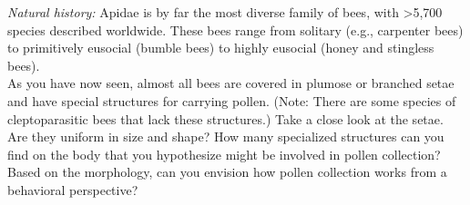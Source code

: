 \documentclass[letterpaper, 11pt]{article}
\begin{document}
\noindent{}\textit{Natural history:} Apidae is by far the most diverse family of bees, with \textgreater5,700 species described worldwide. These bees range from solitary (e.g., carpenter bees) to primitively eusocial (bumble bees) to highly eusocial (honey and stingless bees). \\

\noindent{}As you have now seen, almost all bees are covered in plumose or branched setae and have special structures for carrying pollen. (Note: There are some species of cleptoparasitic bees that lack these structures.) Take a close look at the setae. Are they uniform in size and shape? How many specialized structures can you find on the body that you hypothesize might be involved in pollen collection? Based on the morphology, can you envision how pollen collection works from a behavioral perspective?

\FloatBarrier


\end{document}
